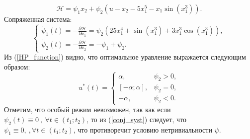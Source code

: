 \documentclass[11pt]{article}
\begin{document}
\begin{equation}\label{HP_function}
	\mathcal{H} = \psi_1 x_2 + \psi_2(u - x_2 - 5 x_1^5 - x_1 \sin(x_1^3)).
\end{equation}
Сопряженная система:
\begin{equation}\label{conj_syst}
	\begin{cases}
		\dot{\psi}_1(t) = -\frac{\partial \mathcal{H}}{\partial x_1} = \psi_2(25x_1^4 + \sin(x_1^3) + 3x_1^3\cos(x_1^3)),
		\\
		\dot{\psi}_2(t) = -\frac{\partial \mathcal{H}}{\partial x_2} = -\psi_1 + \psi_2.
	\end{cases}
\end{equation}
Из (\ref{HP_function}) видно, что оптимальное уравление выражается следующим образом:
\begin{equation}\label{opt_control}
	u^*(t) = \begin{cases}
				\alpha, & \psi_2 > 0,
				\\
				[-\alpha; \alpha], & \psi_2 = 0,
				\\
				-\alpha, & \psi_2 < 0.	
		      \end{cases}
\end{equation}
Отметим, что особый режим невозможен, так как если \( \psi_2(t) \equiv 0\ , \ \forall t \in (t_1; t_2) \), то из (\ref{conj_syst}) следует, что \( \psi_1 \equiv 0 , \ , \forall t \in (t_1; t_2) \), что противоречит условию нетривиальности \( \psi \).
\end{document}
